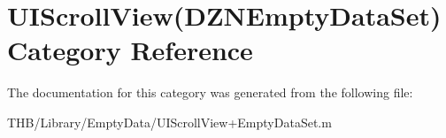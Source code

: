 \hypertarget{category_u_i_scroll_view_07_d_z_n_empty_data_set_08}{}\section{U\+I\+Scroll\+View(D\+Z\+N\+Empty\+Data\+Set) Category Reference}
\label{category_u_i_scroll_view_07_d_z_n_empty_data_set_08}


The documentation for this category was generated from the following file\+:\begin{DoxyCompactItemize}
\item 
T\+H\+B/\+Library/\+Empty\+Data/U\+I\+Scroll\+View+\+Empty\+Data\+Set.\+m\end{DoxyCompactItemize}
